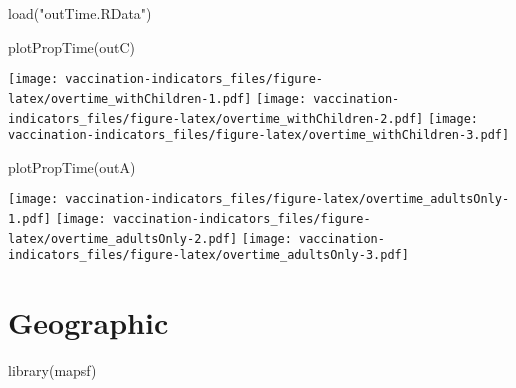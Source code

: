 \documentclass[
]{article}
\newenvironment{Shaded}{\begin{snugshade}}{\end{snugshade}}
\newcommand{\AttributeTok}[1]{\textcolor[rgb]{0.77,0.63,0.00}{#1}}
\newcommand{\CommentTok}[1]{\textcolor[rgb]{0.56,0.35,0.01}{\textit{#1}}}
\newcommand{\FunctionTok}[1]{\textcolor[rgb]{0.00,0.00,0.00}{#1}}
\newcommand{\NormalTok}[1]{#1}
\newcommand{\OtherTok}[1]{\textcolor[rgb]{0.56,0.35,0.01}{#1}}
\newcommand{\SpecialCharTok}[1]{\textcolor[rgb]{0.00,0.00,0.00}{#1}}
\newcommand{\StringTok}[1]{\textcolor[rgb]{0.31,0.60,0.02}{#1}}
\begin{document}
\begin{Shaded}
\end{Shaded}

\begin{Shaded}
\begin{Highlighting}[]
\FunctionTok{load}\NormalTok{(}\StringTok{"outTime.RData"}\NormalTok{)}

\FunctionTok{plotPropTime}\NormalTok{(outC)}
\end{Highlighting}
\end{Shaded}

\texttt{[image: vaccination-indicators\_files/figure-latex/overtime\_withChildren-1.pdf]}
\texttt{[image: vaccination-indicators\_files/figure-latex/overtime\_withChildren-2.pdf]}
\texttt{[image: vaccination-indicators\_files/figure-latex/overtime\_withChildren-3.pdf]}

\begin{Shaded}
\begin{Highlighting}[]
\FunctionTok{plotPropTime}\NormalTok{(outA)}
\end{Highlighting}
\end{Shaded}

\texttt{[image: vaccination-indicators\_files/figure-latex/overtime\_adultsOnly-1.pdf]}
\texttt{[image: vaccination-indicators\_files/figure-latex/overtime\_adultsOnly-2.pdf]}
\texttt{[image: vaccination-indicators\_files/figure-latex/overtime\_adultsOnly-3.pdf]}

\hypertarget{geographic}{%
\section{Geographic}\label{geographic}}

\begin{Shaded}
\begin{Highlighting}[]
\FunctionTok{library}\NormalTok{(mapsf)}
\end{Highlighting}
\end{Shaded}
\end{document}
